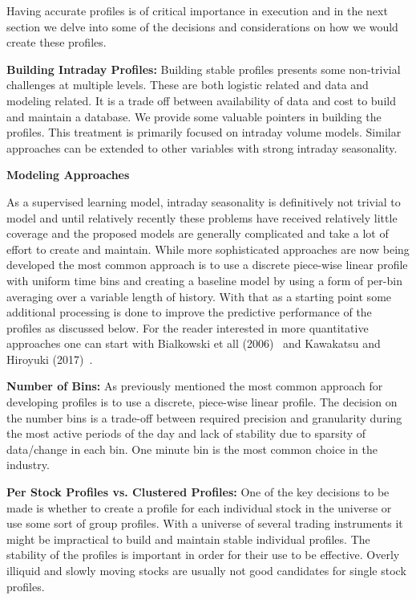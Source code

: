 Having accurate profiles is of critical importance in execution and in the next section we delve into some of the decisions and considerations on how we would create these profiles.



\noindent\textbf{Building Intraday Profiles:} Building stable profiles presents some non-trivial challenges at multiple levels. These are both logistic related and data and modeling related. It is a trade off between availability of data and cost to build and maintain a database. We provide some valuable pointers in building the profiles. This treatment is primarily focused on intraday volume models. Similar approaches can be extended to other variables with strong intraday seasonality. \twomedskip


\noindent\textbf{Modeling Approaches} \twomedskip

As a supervised learning model, intraday seasonality is definitively not trivial to model and until relatively recently these problems have received relatively little coverage and the proposed models are generally complicated and take a lot of effort to create and maintain. While more sophisticated approaches are now being developed the most common approach is to use a discrete piece-wise linear profile with uniform time bins and creating a baseline model by using a form of per-bin averaging over a variable length of history. With that as a starting point some additional processing is done to improve the predictive performance of the profiles as discussed below. For the reader interested in more quantitative approaches one can start with Bialkowski et all (2006)~\cite{bidafol} and Kawakatsu and Hiroyuki (2017)~\cite{kawhiro}. \twomedskip


\noindent\textbf{Number of Bins:} As previously mentioned the most common approach for developing profiles is to use a discrete, piece-wise linear profile. The decision on the number bins is a trade-off between required precision and granularity during the most active periods of the day and lack of stability due to sparsity of data/change in each bin. One minute bin is the most common choice in the industry. \twomedskip


\noindent\textbf{Per Stock Profiles vs. Clustered Profiles:} One of the key decisions to be made is whether to create a profile for each individual stock in the universe or use some sort of group profiles. With a universe of several trading instruments it might be impractical to build and maintain stable individual profiles. The stability of the profiles is important in order for their use to be effective. Overly illiquid and slowly moving stocks are usually not good candidates for single stock profiles. 


